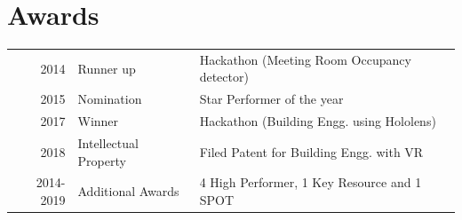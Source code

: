 \documentclass[]{shrikant-resume-openfont}
\begin{document}
\begin{minipage}[t]{0.66\textwidth}

\section{Awards} 
\begin{tabular}{rll}
2014	 & Runner up & Hackathon (Meeting Room Occupancy detector)\\
2015	 & Nomination & Star Performer of the year\\
2017	 & Winner & Hackathon (Building Engg. using Hololens)\\
2018     & Intellectual Property & Filed Patent for Building Engg. with VR\\
2014-2019 & Additional Awards & 4 High Performer, 1 Key Resource and 1 SPOT\\
\end{tabular}
\sectionsep

\end{minipage} 
\end{document}
